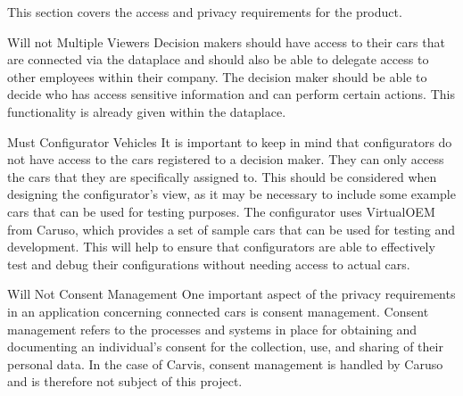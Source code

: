 This section covers the access and privacy requirements for the product.

{Will not}
{Multiple Viewers}
{Decision makers should have access to their cars that are connected via the \gls{dataplace} and should also be able to delegate access to other employees within their company. The decision maker should be able to decide who has access sensitive information and can perform certain actions. This functionality is already given within the \gls{dataplace}.}
{}

{Must}
{Configurator Vehicles}
{It is important to keep in mind that configurators do not have access to the cars registered to a decision maker. They can only access the cars that they are specifically assigned to. This should be considered when designing the configurator's view, as it may be necessary to include some example cars that can be used for testing purposes.}
{The configurator uses VirtualOEM from Caruso, which provides a set of sample cars that can be used for testing and development. This will help to ensure that configurators are able to effectively test and debug their configurations without needing access to actual cars.}

{Will Not}
{Consent Management}
{One important aspect of the privacy requirements in an application concerning connected cars is consent management. Consent management refers to the processes and systems in place for obtaining and documenting an individual's consent for the collection, use, and sharing of their personal data. In the case of Carvis, consent management is handled by Caruso and is therefore not subject of this project.}


